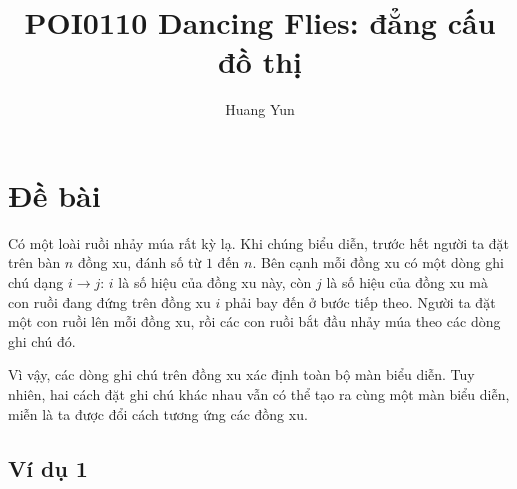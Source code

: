 \documentclass[11pt]{article}
\title{POI0110 Dancing Flies: đẳng cấu đồ thị}
\author{Huang Yun}
\date{}
\begin{document}
\maketitle


\tableofcontents

\section{Đề bài}

Có một loài ruồi nhảy múa rất kỳ lạ. Khi chúng biểu diễn, trước hết người ta
đặt trên bàn \(n\) đồng xu, đánh số từ \(1\) đến \(n\). Bên cạnh mỗi đồng xu có
một dòng ghi chú dạng \(i\to j\): \(i\) là số hiệu của đồng xu này, còn \(j\)
là số hiệu của đồng xu mà con ruồi đang đứng trên đồng xu \(i\) phải bay đến ở
bước tiếp theo. Người ta đặt một con ruồi lên mỗi đồng xu, rồi các con ruồi bắt
đầu nhảy múa theo các dòng ghi chú đó.

Vì vậy, các dòng ghi chú trên đồng xu xác định toàn bộ màn biểu diễn. Tuy
nhiên, hai cách đặt ghi chú khác nhau vẫn có thể tạo ra cùng một màn biểu diễn,
miễn là ta được đổi cách tương ứng các đồng xu.

\begin{center}
\end{center}

\subsection{Ví dụ 1}
\end{document}
